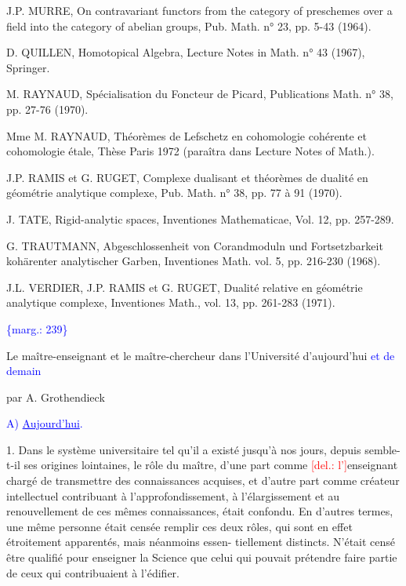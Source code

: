 \documentclass[11pt]{article}
\newcommand{\scanpage}[1]{\par\bigskip\noindent{\small\sffamily[scan #1]}\par}
\newcommand{\mspage}[1]{{\small\sffamily[p.\,#1]}}
\newcommand{\hand}[1]{\textcolor{blue}{#1}}
\newcommand{\margin}[1]{\textcolor{blue}{\{\textsf{marg.:} #1\}}}
\newcommand{\deleted}[1]{\textcolor{red}{[\textsf{del.:} #1]}}
\newcommand{\uline}[1]{\underline{#1}}
\begin{document}
J.P. MURRE, On contravariant functors from the
category of preschemes over a field into
the category of abelian groups, Pub. Math.
n° 23, pp. 5-43 (1964).

D. QUILLEN, Homotopical Algebra, Lecture Notes in
Math. n° 43 (1967), Springer.

M. RAYNAUD, Spécialisation du Foncteur de Picard,
Publications Math. n° 38, pp. 27-76 (1970).

Mme M. RAYNAUD, Théorèmes de Lefschetz en cohomologie
cohérente et cohomologie étale, Thèse
Paris 1972 (paraîtra dans Lecture Notes
of Math.).

J.P. RAMIS et G. RUGET, Complexe dualisant et
théorèmes de dualité en géométrie analytique
complexe, Pub. Math. n° 38, pp. 77 à 91 (1970).

J. TATE, Rigid-analytic spaces, Inventiones Mathematicae,
Vol. 12, pp. 257-289.

G. TRAUTMANN, Abgeschlossenheit von Corandmoduln
und Fortsetzbarkeit kohärenter analytischer
Garben, Inventiones Math. vol. 5,
pp. 216-230 (1968).

J.L. VERDIER, J.P. RAMIS et G. RUGET, Dualité relative
en géométrie analytique complexe,
Inventiones Math., vol. 13, pp. 261-283 (1971).

\margin{239}

\clearpage
\scanpage{119/241}
\mspage{1}

Le maître-enseignant et le maître-chercheur dans
l'Université d'aujourd'hui \hand{et de demain}

par A. Grothendieck

\hand{A) \uline{Aujourd'hui}.}

1. Dans le système universitaire tel qu'il a existé jusqu'à nos jours,
depuis semble-t-il ses origines lointaines, le rôle du maître, d'une part
comme \deleted{l'}enseignant chargé de transmettre des connaissances acquises, et
d'autre part comme créateur intellectuel contribuant à l'approfondissement,
à l'élargissement et au renouvellement de ces mêmes connaissances, était
confondu. En d'autres termes, une même personne était censée remplir ces
deux rôles, qui sont en effet étroitement apparentés, mais néanmoins essen-%
tiellement distincts. N'était censé être qualifié pour enseigner la Science
que celui qui pouvait prétendre faire partie de ceux qui contribuaient à
l'édifier.
\end{document}
